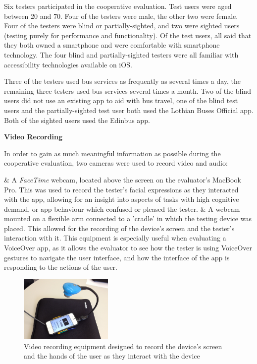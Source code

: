 \documentclass[10pt,twocolumn]{article}
\begin{document}
Six testers participated in the cooperative evaluation. Test users were aged between 20 and 70. Four of the testers were male, the other two were female. Four of the testers were blind or partially-sighted, and two were sighted users (testing purely for performance and functionality). Of the test users, all said that they both owned a smartphone and were comfortable with smartphone technology. The four blind and partially-sighted testers were all familiar with accessibility technologies available on iOS.

Three of the testers used bus services as frequently as several times a day, the remaining three testers used bus services several times a month. Two of the blind users did not use an existing app to aid with bus travel, one of the blind test users and the partially-sighted test user both used the Lothian Buses Official app. Both of the sighted users used the Edinbus app.

\textbf{Video Recording}

In order to gain as much meaningful information as possible during the cooperative evaluation, two cameras were used to record video and audio:
\begin{easylist}[enumerate]
& A \textit{FaceTime} webcam, located above the screen on the evaluator's MacBook Pro. This was used to record the tester's facial expressions as they interacted with the app, allowing for an insight into aspects of tasks with high cognitive demand, or app behaviour which confused or pleased the tester.
& A webcam mounted on a flexible arm connected to a 'cradle' in which the testing device was placed. This allowed for the recording of the device's screen and the tester's interaction with it. This equipment is especially useful when evaluating a VoiceOver app, as it allows the evaluator to see how the tester is using VoiceOver gestures to navigate the user interface, and how the interface of the app is responding to the actions of the user.
\end{easylist}

\begin{figure}[htbp]
  \centering
    \includegraphics[width=0.4\textwidth,trim=100 100 100 100,clip]{rig}
    \caption{Video recording equipment designed to record the device's screen and the hands of the user as they interact with the device}
\end{figure}
\end{document}
